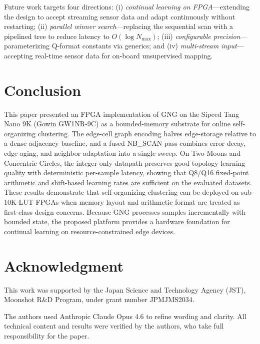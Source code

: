 \documentclass[conference]{IEEEtran}
\begin{document}
Future work targets four directions: (i) \emph{continual learning on FPGA}---extending the design to accept streaming sensor data and adapt continuously without restarting; (ii) \emph{parallel winner search}---replacing the sequential scan with a pipelined tree to reduce latency to $O(\log N_{\max})$; (iii) \emph{configurable precision}---parameterizing Q-format constants via generics; and (iv) \emph{multi-stream input}---accepting real-time sensor data for on-board unsupervised mapping.


\section{Conclusion}
This paper presented an FPGA implementation of GNG on the Sipeed Tang Nano 9K (Gowin GW1NR-9C) as a bounded-memory substrate for online self-organizing clustering. The edge-cell graph encoding halves edge-storage relative to a dense adjacency baseline, and a fused NB\_SCAN pass combines error decay, edge aging, and neighbor adaptation into a single sweep. On Two Moons and Concentric Circles, the integer-only datapath preserves good topology learning quality with deterministic per-sample latency, showing that Q8/Q16 fixed-point arithmetic and shift-based learning rates are sufficient on the evaluated datasets. These results demonstrate that self-organizing clustering can be deployed on sub-10K-LUT FPGAs when memory layout and arithmetic format are treated as first-class design concerns. Because GNG processes samples incrementally with bounded state, the proposed platform provides a hardware foundation for continual learning on resource-constrained edge devices.

\section*{Acknowledgment}
This work was supported by the Japan Science and Technology Agency (JST), Moonshot R\&D Program, under grant number JPMJMS2034.

The authors used Anthropic Claude Opus 4.6 to refine wording and clarity. All technical content and results were verified by the authors, who take full responsibility for the paper.


\end{document}
